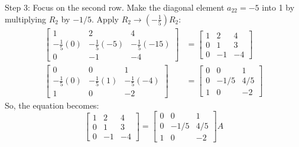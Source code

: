 \documentclass{article}
\begin{document}
Step 3: Focus on the second row. Make the diagonal element $a_{22}=-5$ into 1 by multiplying $R_2$ by $-1/5$.
Apply $R_2 \to (-\frac{1}{5})R_2$:
\begin{align*} \begin{bmatrix} 1 & 2 & 4 \\ -\frac{1}{5}(0) & -\frac{1}{5}(-5) & -\frac{1}{5}(-15) \\ 0 & -1 & -4 \end{bmatrix} &= \begin{bmatrix} 1 & 2 & 4 \\ 0 & 1 & 3 \\ 0 & -1 & -4 \end{bmatrix} \\ \begin{bmatrix} 0 & 0 & 1 \\ -\frac{1}{5}(0) & -\frac{1}{5}(1) & -\frac{1}{5}(-4) \\ 1 & 0 & -2 \end{bmatrix} &= \begin{bmatrix} 0 & 0 & 1 \\ 0 & -1/5 & 4/5 \\ 1 & 0 & -2 \end{bmatrix}\end{align*}
So, the equation becomes:
\[ \begin{bmatrix} 1 & 2 & 4 \\ 0 & 1 & 3 \\ 0 & -1 & -4 \end{bmatrix} = \begin{bmatrix} 0 & 0 & 1 \\ 0 & -1/5 & 4/5 \\ 1 & 0 & -2 \end{bmatrix} A \]
\end{document}
